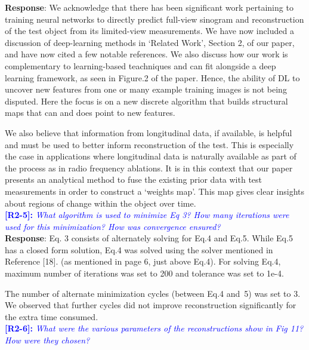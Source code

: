 \documentclass[11pt]{article}
\begin{document}
\textbf{Response}: We acknowledge that there has been significant work pertaining to training neural networks to directly predict full-view sinogram and reconstruction of the test object from its limited-view measurements. We have now included a discussion of deep-learning methods in `Related Work', Section 2, of our paper, and have now cited a few notable references. We also discuss how
    our work is complementary to learning-based teachniques and can
    fit alongside a deep learning framework, as seen in Figure.2 of the paper. Hence, the ability of DL to
    uncover new features from one or many example training images is not being disputed. Here the focus is on a new discrete algorithm that builds structural maps that can and does point to new features.

We also believe that information from longitudinal data, if available, is helpful and must be used to better inform reconstruction of the test. This is especially the case in applications where longitudinal data is naturally available as part of the process as in radio frequency ablations. It is in this context that our paper presents an analytical method to fuse the existing prior data with test measurements in order to construct a `weights map'. This map gives clear insights about regions of change within the object over time.\\



\vspace{0.5cm}\textcolor{blue}{\textbf{[R2-5]:} \textit{What algorithm is used to minimize Eq 3? How many iterations were used for this minimization? How was convergence ensured?}}\\

\textbf{Response}: Eq. 3 consists of alternately solving for Eq.4 and Eq.5. While Eq.5 has a closed form solution, Eq.4 was solved using the solver mentioned in Reference [18]. (as mentioned in page 6, just above Eq.4). 
For solving Eq.4, maximum number of iterations was set to 200 and tolerance was set to 1e-4.

The number of alternate minimization cycles (between Eq.4 and~5) was set to 3. We observed that further cycles did not improve reconstruction significantly for the extra time consumed.
\\

\vspace{0.5cm}\textcolor{blue}{\textbf{[R2-6]:} \textit{What were the various parameters of the reconstructions show in Fig 11? How were they chosen?
}}\\
\end{document}
